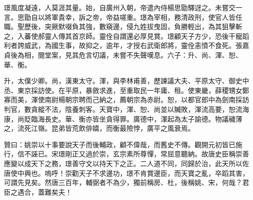 \begin{pinyinscope}
 璟風度凝遠，人莫涯其量。始，自廣州入朝，帝遣內侍楊思勖驛迓之。未嘗交一言。思勖自以將軍貴幸，訴之帝，帝益嗟重。璟為宰相，務清政刑，使官人皆任職。聖歷後，突厥默啜負其強，數窺邊，侵九姓拔曳固，負勝輕出，為其狙擊斬之，入蕃使郝靈人傳其首京師。靈佺自謂還必厚見賞。璟顧天子方少，恐後干寵蹈利者誇威武，為國生事，故抑之，逾年，才授右武衛郎將，靈佺恚憤不食死。張嘉貞後為相，閱堂案，見其危言切議，未嘗不失聲嘆息。六子：升、尚、渾、恕、華、衡。



 升，太僕少卿。尚，漢東太守。渾，與李林甫善，歷諫議大夫、平原太守、御史中丞、東京採訪使。在平原，暴斂求進，至重取民一年庸、租。使東畿，薛稷甥女鄭寡而美，渾使南尉楊朝宗聘而己納之，薦朝宗為赤尉。恕，以都官郎中為劍南採訪判官，數貪縱不法，陰養刺客。天寶中，渾、恕、尚並以贓敗，渾流高要，恕流海康，尚貶臨海長史。華、衡亦皆坐貪得罪。廣德中，渾起為太子諭德。物議穢薄之，流死江嶺。昆弟皆荒飲俳嬉，而衡最險悖，廣平之風衰焉。



 贊曰：姚崇以十事要說天子而後輔政，顧不偉哉，而舊史不傳。觀開元初皆已施行，信不誣已。宋璟剛正又過於崇，玄宗素所尊憚，常屈意聽納。故唐史臣稱崇善應變以成天下之務，璟善守文以持天下之正。二人道不同，同歸於治，此天所以佐唐使中興也。嗚呼！崇勸天子不求邊功，璟不肯賞邊臣，而天寶之亂，卒蹈其害，可謂先見矣。然唐三百年，輔弼者不為少，獨前稱房、杜，後稱姚、宋，何哉？君臣之遇合，蓋難矣夫！



\end{pinyinscope}